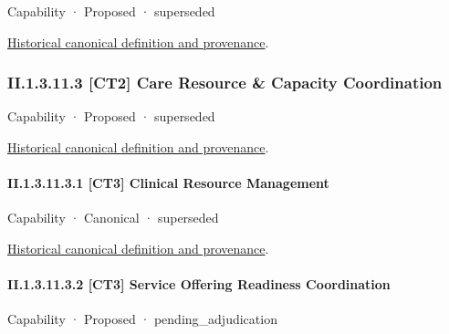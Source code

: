 \label{element:59b9331fa3c04ef09bf963ad8a5d0d71}
{\small Capability · Proposed · superseded}\par
\href{../../../../continuum/strategy/capability/59b9331fa3c04ef09bf963ad8a5d0d71.md}{Historical canonical definition and provenance}.\par
\subsubsection*{II.1.3.11.3 [CT2] Care Resource \& Capacity Coordination}
\label{navigation:II.1.3.11.3}

\label{element:96f71cb8fa6844d7aa7e9f16759a3a62}
{\small Capability · Proposed · superseded}\par
\href{../../../../continuum/strategy/capability/96f71cb8fa6844d7aa7e9f16759a3a62.md}{Historical canonical definition and provenance}.\par
\paragraph*{II.1.3.11.3.1 [CT3] Clinical Resource Management}
\label{navigation:II.1.3.11.3.1}

\label{element:a5faedcd97064c28b9e7e551e9106ea1}
{\small Capability · Canonical · superseded}\par
\href{../../../../continuum/strategy/capability/a5faedcd97064c28b9e7e551e9106ea1.md}{Historical canonical definition and provenance}.\par
\paragraph*{II.1.3.11.3.2 [CT3] Service Offering Readiness Coordination}
\label{navigation:II.1.3.11.3.2}

\label{element:0caecaba5d3e4781b8671b12c13ee283}
{\small Capability · Proposed · pending\_adjudication}\par

